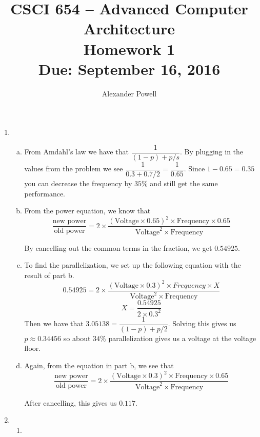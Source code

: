 \documentclass[10pt]{article} %
\title{CSCI 654 -- Advanced Computer Architecture \\
Homework 1 \\
{\large{\bf Due: September 16, 2016}}}
\date{}
\author{Alexander Powell}
\begin{document}
\maketitle
\begin{enumerate}

\item %

\begin{enumerate}[(a)]
\item

From Amdahl's law we have that $\dfrac{1}{(1-p) + p/s}$.  By plugging in the values from the problem we see $\dfrac{1}{0.3 + 0.7/2} = \dfrac{1}{0.65}$.  Since $1 - 0.65 = 0.35$ you can decrease the frequency by $35\%$ and still get the same performance.  

\item

From the power equation, we know that 
$$ \dfrac{\text{new power}}{\text{old power}} = 2 \times \dfrac{(\text{Voltage} \times 0.65)^2 \times \text{Frequency} \times 0.65}{\text{Voltage}^2 \times \text{Frequency}} $$

By cancelling out the common terms in the fraction, we get $0.54925$.  

\item

To find the parallelization, we set up the following equation with the result of part b.  
$$ 0.54925 = 2 \times \dfrac{(\text{Voltage} \times 0.3)^2 \times{Frequency} \times X}{\text{Voltage}^2 \times \text{Frequency}} $$
$$ X = \dfrac{0.54925}{2 \times 0.3^2} $$
Then we have that $3.05138 = \dfrac{1}{(1-p) + p/2}$.  Solving this gives us $p \approx 0.34456$ so about $34\%$ parallelization gives us a voltage at the voltage floor.  

\item

Again, from the equation in part b, we see that
$$ \dfrac{\text{new power}}{\text{old power}} = 2 \times \dfrac{(\text{Voltage} \times 0.3)^2 \times \text{Frequency} \times 0.65}{\text{Voltage}^2 \times \text{Frequency}} $$

After cancelling, this gives us $0.117$.  

\end{enumerate}

\item %

\begin{enumerate}

\item


\end{enumerate}
\end{enumerate}
\end{document}
